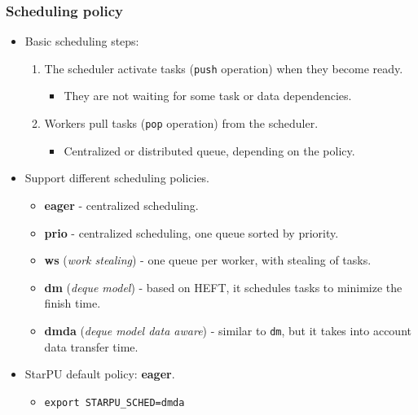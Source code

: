 \begin{frame}[fragile]
  \frametitle{Scheduling policy}
  \begin{itemize}
  \item Basic scheduling steps:
    \begin{enumerate}[<2->]
    \item The scheduler activate tasks (\texttt{push} operation) when they become ready.
      \begin{itemize}
      \item They are not waiting for some task or data dependencies.
      \end{itemize}
    \item Workers pull tasks (\texttt{pop} operation) from the scheduler.
      \begin{itemize}
      \item Centralized or distributed queue, depending on the policy.
      \end{itemize}
    \end{enumerate}

  \item<3-> Support different scheduling policies.
    \begin{itemize}
    \item<4-> {\bf eager} - centralized scheduling.
    \item<5-> {\bf prio} - centralized scheduling, one queue sorted by priority.
    \item<6-> {\bf ws} (\emph{work stealing}) - one queue per worker, with stealing of tasks.
    \item<7-> {\bf dm} (\emph{deque model}) - based on HEFT, it schedules tasks to
    minimize the finish time.
    \item<8-> {\bf dmda} (\emph{deque model data aware}) - similar to \texttt{dm}, but it takes into 
      account data transfer time. 
    \end{itemize}

  \item<9-> StarPU default policy: \textbf{eager}.
    \begin{itemize}
    \item \verb+export STARPU_SCHED=dmda+
    \end{itemize}
  \end{itemize}
\end{frame}
